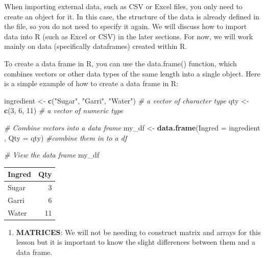 \documentclass[
]{article}
\newenvironment{Shaded}{\begin{snugshade}}{\end{snugshade}}
\newcommand{\AttributeTok}[1]{\textcolor[rgb]{0.13,0.29,0.53}{#1}}
\newcommand{\CommentTok}[1]{\textcolor[rgb]{0.56,0.35,0.01}{\textit{#1}}}
\newcommand{\DecValTok}[1]{\textcolor[rgb]{0.00,0.00,0.81}{#1}}
\newcommand{\FunctionTok}[1]{\textcolor[rgb]{0.13,0.29,0.53}{\textbf{#1}}}
\newcommand{\NormalTok}[1]{#1}
\newcommand{\OtherTok}[1]{\textcolor[rgb]{0.56,0.35,0.01}{#1}}
\newcommand{\StringTok}[1]{\textcolor[rgb]{0.31,0.60,0.02}{#1}}
\providecommand{\tightlist}{%
  \setlength{\itemsep}{0pt}\setlength{\parskip}{0pt}}
\begin{document}
When importing external data, such as CSV or Excel files, you only need
to create an object for it. In this case, the structure of the data is
already defined in the file, so you do not need to specify it again. We
will discuss how to import data into R (such as Excel or CSV) in the
later sections. For now, we will work mainly on data (specifically
dataframes) created within R.

To create a data frame in R, you can use the data.frame() function,
which combines vectors or other data types of the same length into a
single object. Here is a simple example of how to create a data frame in
R:

\begin{Shaded}
\begin{Highlighting}[]
\NormalTok{ingredient }\OtherTok{\textless{}{-}} \FunctionTok{c}\NormalTok{(}\StringTok{"Sugar"}\NormalTok{, }\StringTok{"Garri"}\NormalTok{, }\StringTok{"Water"}\NormalTok{) }\CommentTok{\# a vector of character type}
\NormalTok{qty }\OtherTok{\textless{}{-}} \FunctionTok{c}\NormalTok{(}\DecValTok{3}\NormalTok{, }\DecValTok{6}\NormalTok{, }\DecValTok{11}\NormalTok{) }\CommentTok{\# a vector of numeric type}

\CommentTok{\# Combine vectors into a data frame}
\NormalTok{my\_df }\OtherTok{\textless{}{-}} \FunctionTok{data.frame}\NormalTok{(}\AttributeTok{Ingred =}\NormalTok{ ingredient , }\AttributeTok{Qty =}\NormalTok{ qty) }\CommentTok{\#combine them in to a df}

\CommentTok{\# View the data frame}
\NormalTok{my\_df}
\end{Highlighting}
\end{Shaded}

\begin{longtable}[]{@{}lr@{}}
\toprule\noalign{}
Ingred & Qty \\
\midrule\noalign{}
\endhead
\bottomrule\noalign{}
\endlastfoot
Sugar & 3 \\
Garri & 6 \\
Water & 11 \\
\end{longtable}

\begin{enumerate}
\def\labelenumi{\arabic{enumi}.}
\setcounter{enumi}{5}
\tightlist
\item
  \textbf{MATRICES}: We will not be needing to construct matrix and
  arrays for this lesson but it is important to know the slight
  differences between them and a data frame.
\end{enumerate}
\end{document}
